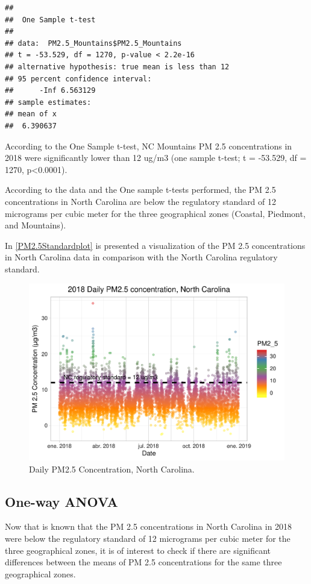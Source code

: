 \documentclass[12pt,]{article}
\begin{document}
\begin{verbatim}
## 
##  One Sample t-test
## 
## data:  PM2.5_Mountains$PM2.5_Mountains
## t = -53.529, df = 1270, p-value < 2.2e-16
## alternative hypothesis: true mean is less than 12
## 95 percent confidence interval:
##      -Inf 6.563129
## sample estimates:
## mean of x 
##  6.390637
\end{verbatim}

According to the One Sample t-test, NC Mountains PM 2.5 concentrations
in 2018 were significantly lower than 12 ug/m3 (one sample t-test; t =
-53.529, df = 1270, p\textless{}0.0001).

According to the data and the One sample t-tests performed, the PM 2.5
concentrations in North Carolina are below the regulatory standard of 12
micrograms per cubic meter for the three geographical zones (Coastal,
Piedmont, and Mountains).

In \autoref{PM2.5Standardplot} is presented a visualization of the PM
2.5 concentrations in North Carolina data in comparison with the North
Carolina regulatory standard.

\begin{figure}
\centering
\includegraphics{Raby_ENV872_Project_files/figure-latex/unnamed-chunk-51-1.pdf}
\caption{Daily PM2.5 Concentration, North Carolina.
\label{PM2.5Standardplot}}
\end{figure}

\subsection{One-way ANOVA}\label{one-way-anova}

Now that is known that the PM 2.5 concentrations in North Carolina in
2018 were below the regulatory standard of 12 micrograms per cubic meter
for the three geographical zones, it is of interest to check if there
are significant differences between the means of PM 2.5 concentrations
for the same three geographical zones.
\end{document}
